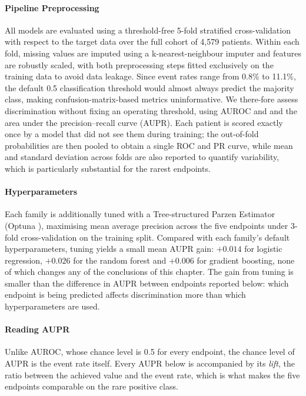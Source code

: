\paragraph{Pipeline Preprocessing}
All models are evaluated using a threshold-free 5-fold
stratified cross-validation with respect to the target data over the full cohort of 4,579 patients. Within each fold, missing
values are imputed using a k-nearest-neighbour imputer and features are robustly scaled,
with both preprocessing steps fitted exclusively on the training data to avoid data leakage.
Since event rates range from 0.8\% to 11.1\%, the default 0.5 classification threshold would almost always
predict the majority class, making confusion-matrix-based metrics uninformative. We there-fore assess
discrimination without fixing an operating threshold, using AUROC and and the area under the precision--recall curve (AUPR).
Each patient is scored exactly once by a model that did not see them during training; 
the out-of-fold probabilities are then pooled to obtain a single ROC and PR curve, while mean and
standard deviation across folds are also reported to quantify variability, which is particularly
substantial for the rarest endpoints.

\paragraph{Hyperparameters}
Each family is additionally tuned with a Tree-structured Parzen Estimator
\citep{bergstra2011tpe} (Optuna \citep{akiba2019optuna}), maximising mean average precision across the five endpoints under
3-fold cross-validation on the training split. Compared with each family's
default hyperparameters, tuning yields a small mean AUPR gain: $+0.014$ for
logistic regression, $+0.026$ for the random forest and $+0.006$ for gradient
boosting, none of which changes any of the conclusions of this chapter. The
gain from tuning is smaller than the difference in AUPR between endpoints
reported below: which endpoint is being predicted affects discrimination more
than which hyperparameters are used.

\paragraph{Reading AUPR}
Unlike AUROC, whose chance level is 0.5 for every endpoint, the chance level
of AUPR is the event rate itself. Every AUPR
below is accompanied by its \emph{lift}, the ratio between the achieved value
and the event rate, which is what makes the five endpoints comparable on the
rare positive class.

